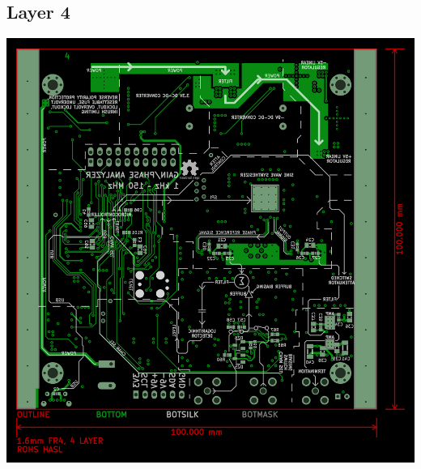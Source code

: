\documentclass[article,oneside]{memoir}
\begin{document}
\begin{appendices}
    \newpage \section{Layer 4}
    \begin{vplace}\includegraphics[width=6.5in]{render_lyr4}\end{vplace}
\end{appendices}
\end{document}
